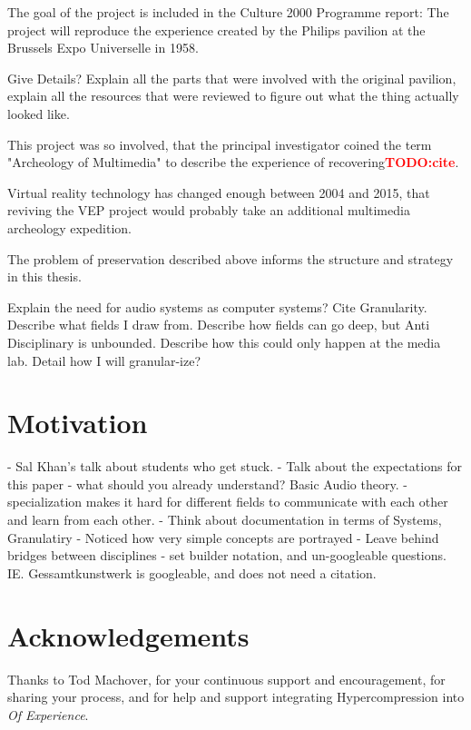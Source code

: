 \documentclass{tufte-book}
\newcommand{\TODO}[1]{\textcolor{red}{\bf TODO:#1}\xspace}
\newcommand{\thesis}{Hypercompression\xspace}
\begin{document}
The goal of the project is included in the Culture 2000 Programme
report: The project will reproduce the experience created by the
Philips pavilion at the Brussels Expo Universelle in 1958.

Give Details? Explain all the parts that were involved with the
original pavilion, explain all the resources that were reviewed to
figure out what the thing actually looked like.

This project was so involved, that the principal investigator coined
the term "Archeology of Multimedia" to describe the experience of
recovering\TODO{cite}.

Virtual reality technology has changed enough between 2004 and 2015,
that reviving the VEP project would probably take an additional
multimedia archeology expedition.

The problem of preservation described above informs the structure and
strategy in this thesis. 

Explain the need for audio systems as computer systems? Cite
Granularity. Describe what fields I draw from. Describe how fields can
go deep, but Anti Disciplinary is unbounded. Describe how this could
only happen at the media lab. Detail how I will granular-ize?



\section{Motivation}
\label{sec:motivation}

  - Sal Khan's talk about students who get stuck. 
  - Talk about the expectations for this paper - what should you
    already understand? Basic Audio theory. 
  - specialization makes it hard for different fields to communicate
  with each other and learn from each other.
  - Think about documentation in terms of Systems, Granulatiry
  - Noticed how very simple concepts are portrayed 
  - Leave behind bridges between disciplines
  - set builder notation, and un-googleable
  questions. IE. Gessamtkunstwerk is googleable, and does not need a
  citation. 

\backmatter

\section*{Acknowledgements}
\label{sec:acknowledgements}

Thanks to Tod Machover, for your continuous support and encouragement,
for sharing your process, and for help and support integrating \thesis
into \textit{Of Experience}.
\end{document}
